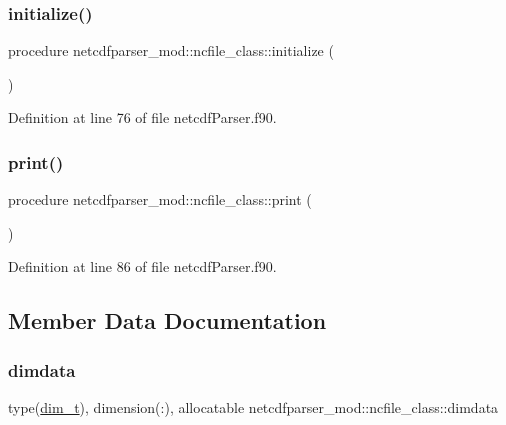 \subsubsection{\texorpdfstring{initialize()}{initialize()}}
{\footnotesize\ttfamily procedure netcdfparser\+\_\+mod\+::ncfile\+\_\+class\+::initialize (\begin{DoxyParamCaption}{ }\end{DoxyParamCaption})\hspace{0.3cm}{\ttfamily [private]}}



Definition at line 76 of file netcdf\+Parser.\+f90.

\mbox{\label{structnetcdfparser__mod_1_1ncfile__class_af7aae078c0672cbfe8e6667311a94dcd}} 
\subsubsection{\texorpdfstring{print()}{print()}}
{\footnotesize\ttfamily procedure netcdfparser\+\_\+mod\+::ncfile\+\_\+class\+::print (\begin{DoxyParamCaption}{ }\end{DoxyParamCaption})\hspace{0.3cm}{\ttfamily [private]}}



Definition at line 86 of file netcdf\+Parser.\+f90.



\subsection{Member Data Documentation}
\mbox{\label{structnetcdfparser__mod_1_1ncfile__class_a4dd2f6e32f04a63ad8c3303d76dab84f}} 
\subsubsection{\texorpdfstring{dimdata}{dimdata}}
{\footnotesize\ttfamily type(\mbox{\hyperlink{structnetcdfparser__mod_1_1dim__t}{dim\+\_\+t}}), dimension(\+:), allocatable netcdfparser\+\_\+mod\+::ncfile\+\_\+class\+::dimdata\hspace{0.3cm}{\ttfamily [private]}}




